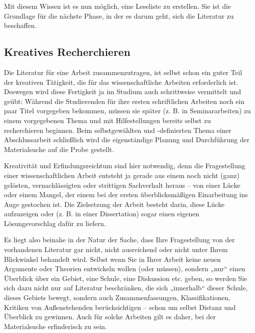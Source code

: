 \documentclass[]{book}
\theoremstyle{definition}
\theoremstyle{definition}
\theoremstyle{definition}
\theoremstyle{remark}
\begin{document}
Mit diesem Wissen ist es nun möglich, eine Leseliste zu erstellen. Sie
ist die Grundlage für die nächste Phase, in der es darum geht, sich die
Literatur zu beschaffen.

\subsection{Kreatives Recherchieren}\label{kreatives-recherchieren}

Die Literatur für eine Arbeit zusammenzutragen, ist selbst schon ein
guter Teil der kreativen Tätigkeit, die für das wissenschaftliche
Arbeiten erforderlich ist. Deswegen wird diese Fertigkeit ja im Studium
auch schrittweise vermittelt und geübt: Während die Studierenden für
ihre ersten schriftlichen Arbeiten noch ein paar Titel vorgegeben
bekommen, müssen sie später (z. B. in Seminararbeiten) zu einem
vorgegebenen Thema und mit Hilfestellungen bereits selbst zu
recherchieren beginnen. Beim selbstgewählten und -definierten Thema
einer Abschlussarbeit schließlich wird die eigenständige Planung und
Durchführung der Materialsuche auf die Probe gestellt.

Kreativität und Erfindungsreichtum sind hier notwendig, denn die
Fragestellung einer wissenschaftlichen Arbeit entsteht ja gerade aus
einem noch nicht (ganz) gelösten, vernachlässigten oder strittigen
Sachverhalt heraus -- von einer Lücke oder einem Mangel, der einem bei
der ersten überblicksmäßigen Einarbeitung ins Auge gestochen ist. Die
Zielsetzung der Arbeit besteht darin, diese Lücke aufzuzeigen oder (z.
B. in einer Dissertation) sogar einen eigenen Lösungsvorschlag dafür zu
liefern.

Es liegt also beinahe in der Natur der Sache, dass Ihre Fragestellung
von der vorhandenen Literatur gar nicht, nicht ausreichend oder nicht
unter Ihrem Blickwinkel behandelt wird. Selbst wenn Sie in Ihrer Arbeit
keine neuen Argumente oder Theorien entwickeln wollen (oder müssen),
sondern „nur`` einen Überblick über ein Gebiet, eine Schule, eine
Diskussion etc. geben, so werden Sie sich dazu nicht nur auf Literatur
beschränken, die sich „innerhalb`` dieser Schule, dieses Gebiets bewegt,
sondern auch Zusammenfassungen, Klassifikationen, Kritiken von
Außenstehenden berücksichtigen -- schon um selbst Distanz und Überblick
zu gewinnen. Auch für solche Arbeiten gilt es daher, bei der
Materialsuche erfinderisch zu sein.
\end{document}
